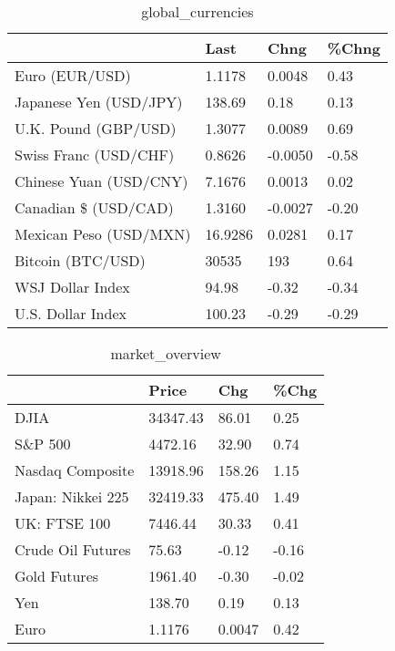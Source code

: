 \documentclass{article}%
\begin{document}
%


\begin{table}[htbp]%
\caption{global\_currencies}%
\centering%
\begin{adjustbox}{width=1\textwidth}%
\begin{tabular}{llll}
\toprule
                       &    Last &    Chng & \%Chng \\
\midrule
        Euro (EUR/USD) &  1.1178 &  0.0048 &  0.43 \\
Japanese Yen (USD/JPY) &  138.69 &    0.18 &  0.13 \\
  U.K. Pound (GBP/USD) &  1.3077 &  0.0089 &  0.69 \\
 Swiss Franc (USD/CHF) &  0.8626 & -0.0050 & -0.58 \\
Chinese Yuan (USD/CNY) &  7.1676 &  0.0013 &  0.02 \\
  Canadian \$ (USD/CAD) &  1.3160 & -0.0027 & -0.20 \\
Mexican Peso (USD/MXN) & 16.9286 &  0.0281 &  0.17 \\
     Bitcoin (BTC/USD) &   30535 &     193 &  0.64 \\
      WSJ Dollar Index &   94.98 &   -0.32 & -0.34 \\
     U.S. Dollar Index &  100.23 &   -0.29 & -0.29 \\
\bottomrule
\end{tabular}
%
\end{adjustbox}%
\end{table}

%


\begin{table}[htbp]%
\caption{market\_overview}%
\centering%
\begin{adjustbox}{width=1\textwidth}%
\begin{tabular}{llll}
\toprule
                  &    Price &    Chg &  \%Chg \\
\midrule
             DJIA & 34347.43 &  86.01 &  0.25 \\
          S\&P 500 &  4472.16 &  32.90 &  0.74 \\
 Nasdaq Composite & 13918.96 & 158.26 &  1.15 \\
Japan: Nikkei 225 & 32419.33 & 475.40 &  1.49 \\
     UK: FTSE 100 &  7446.44 &  30.33 &  0.41 \\
Crude Oil Futures &    75.63 &  -0.12 & -0.16 \\
     Gold Futures &  1961.40 &  -0.30 & -0.02 \\
              Yen &   138.70 &   0.19 &  0.13 \\
             Euro &   1.1176 & 0.0047 &  0.42 \\
\bottomrule
\end{tabular}
%
\end{adjustbox}%
\end{table}

%
\end{document}
